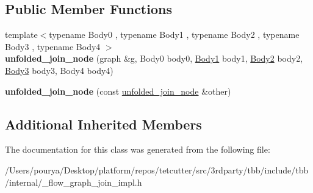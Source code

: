 \subsection*{Public Member Functions}
\begin{DoxyCompactItemize}
\item 
\hypertarget{classinternal_1_1unfolded__join__node_3_015_00_01tag__matching__port_00_01OutputTuple_00_01tag__matching_01_4_a031325b2090f1932bc7f769f88bf0f77}{}{\footnotesize template$<$typename Body0 , typename Body1 , typename Body2 , typename Body3 , typename Body4 $>$ }\\{\bfseries unfolded\+\_\+join\+\_\+node} (graph \&g, Body0 body0, \hyperlink{structBody1}{Body1} body1, \hyperlink{structBody2}{Body2} body2, \hyperlink{structBody3}{Body3} body3, Body4 body4)\label{classinternal_1_1unfolded__join__node_3_015_00_01tag__matching__port_00_01OutputTuple_00_01tag__matching_01_4_a031325b2090f1932bc7f769f88bf0f77}

\item 
\hypertarget{classinternal_1_1unfolded__join__node_3_015_00_01tag__matching__port_00_01OutputTuple_00_01tag__matching_01_4_aa2dea6a8ae079b3d3530dd158240ebe4}{}{\bfseries unfolded\+\_\+join\+\_\+node} (const \hyperlink{classinternal_1_1unfolded__join__node}{unfolded\+\_\+join\+\_\+node} \&other)\label{classinternal_1_1unfolded__join__node_3_015_00_01tag__matching__port_00_01OutputTuple_00_01tag__matching_01_4_aa2dea6a8ae079b3d3530dd158240ebe4}

\end{DoxyCompactItemize}
\subsection*{Additional Inherited Members}


The documentation for this class was generated from the following file\+:\begin{DoxyCompactItemize}
\item 
/\+Users/pourya/\+Desktop/platform/repos/tetcutter/src/3rdparty/tbb/include/tbb/internal/\+\_\+flow\+\_\+graph\+\_\+join\+\_\+impl.\+h\end{DoxyCompactItemize}

